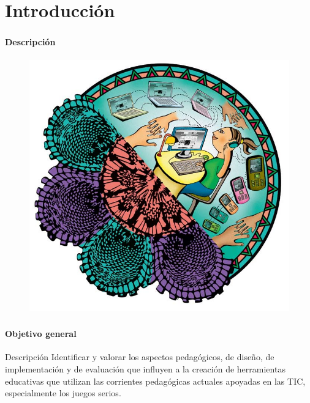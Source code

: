 \section{Introducción}
\setcounter{sectiontotal}{3}

\begin{frame}
\frametitle{\pagetitle}
\framesubtitle{Descripción}
\begin{figure}
\includegraphics[scale=.3]{imagenes/nhanduti}
\end{figure}
\end{frame}

\begin{frame}
\frametitle{\pagetitle}
\framesubtitle{Objetivo general}
\begin{block}{Descripción}
\centering
Identificar y valorar los aspectos pedagógicos, de diseño, de implementación y
de evaluación que influyen a la creación de herramientas educativas que utilizan
las corrientes pedagógicas actuales apoyadas en las TIC, especialmente los
juegos serios.
\end{block}


\end{frame}

